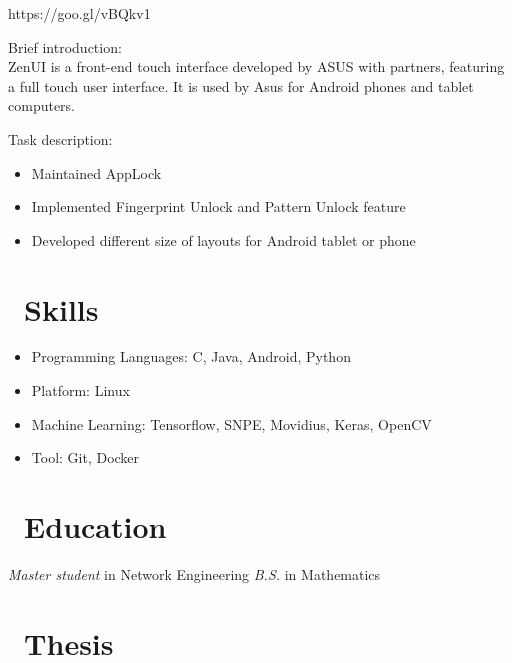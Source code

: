 \documentclass{resume}
\begin{document}
 {https://goo.gl/vBQkv1}
\begin{description}
\item Brief introduction:\\
ZenUI is a front-end touch interface developed by ASUS with partners, featuring a full touch user interface. It is used by Asus for Android phones and tablet computers.\\
\item Task description:
\begin{itemize}
  \item Maintained AppLock
  \item Implemented Fingerprint Unlock and Pattern Unlock feature
  \item Developed different size of layouts for Android tablet or phone
\end{itemize}
\end{description}

\section{\faCogs\ Skills}
\begin{itemize}[parsep=0.5ex]
  \item Programming Languages: C, Java, Android, Python
  \item Platform: Linux
  \item Machine Learning: Tensorflow, SNPE, Movidius, Keras, OpenCV
  \item Tool: Git, Docker
\end{itemize}

\section{\faGraduationCap\ Education}
\textit{Master student} in Network Engineering
\textit{B.S.} in Mathematics

\section {\faTasks\ Thesis}
 {}
\end{document}
